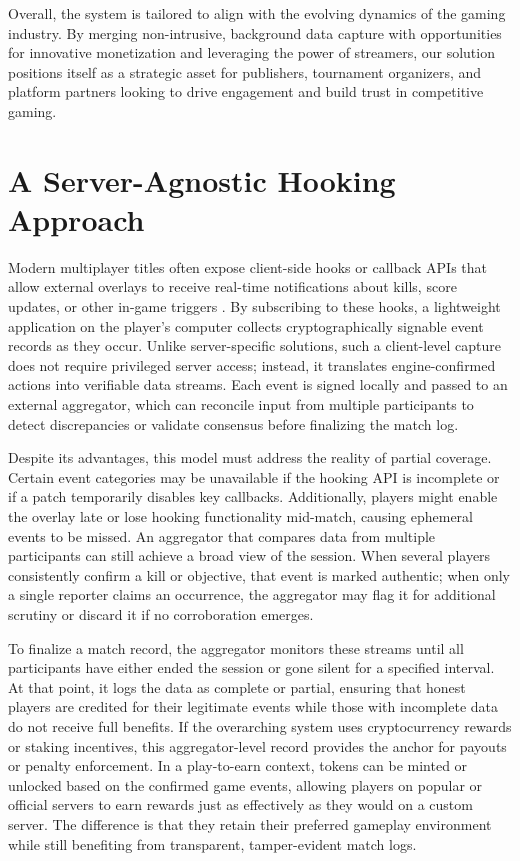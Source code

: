 \documentclass[11pt]{article}
\begin{document}
Overall, the system is tailored to align with the evolving dynamics of the gaming industry. By merging non-intrusive, background data capture with opportunities for innovative monetization and leveraging the power of streamers, our solution positions itself as a strategic asset for publishers, tournament organizers, and platform partners looking to drive engagement and build trust in competitive gaming.


\section{A Server-Agnostic Hooking Approach}
\label{sec:hooks}

Modern multiplayer titles often expose client-side hooks or callback APIs that allow external overlays to receive real-time notifications about kills, score updates, or other in-game triggers \cite{overwolf}\cite{steamworks}\cite{detours}. By subscribing to these hooks, a lightweight application on the player’s computer collects cryptographically signable\cite{rfc8032} event records as they occur. Unlike server-specific solutions, such a client-level capture does not require privileged server access; instead, it translates engine-confirmed actions into verifiable data streams. Each event is signed locally and passed to an external aggregator, which can reconcile input from multiple participants to detect discrepancies or validate consensus before finalizing the match log.

Despite its advantages, this model must address the reality of partial coverage. Certain event categories may be unavailable if the hooking API is incomplete or if a patch temporarily disables key callbacks. Additionally, players might enable the overlay late or lose hooking functionality mid-match, causing ephemeral events to be missed. An aggregator that compares data from multiple participants can still achieve a broad view of the session. When several players consistently confirm a kill or objective, that event is marked authentic; when only a single reporter claims an occurrence, the aggregator may flag it for additional scrutiny or discard it if no corroboration emerges.

To finalize a match record, the aggregator monitors these streams until all participants have either ended the session or gone silent for a specified interval. At that point, it logs the data as complete or partial, ensuring that honest players are credited for their legitimate events while those with incomplete data do not receive full benefits. If the overarching system uses cryptocurrency rewards or staking incentives, this aggregator-level record provides the anchor for payouts or penalty enforcement. In a play-to-earn context, tokens can be minted or unlocked based on the confirmed game events, allowing players on popular or official servers to earn rewards just as effectively as they would on a custom server. The difference is that they retain their preferred gameplay environment while still benefiting from transparent, tamper-evident match logs.
\end{document}
